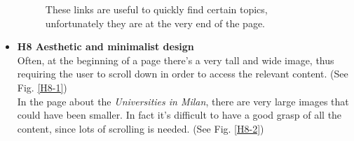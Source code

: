 \begin{itemize}
        \begin{figure}[!ht]
            \begin{minipage}{\linewidth}
                \centering
                \captionsetup{justification=centering}
                \caption{These links are useful to quickly find certain topics,\\unfortunately they are at the very end of the page.}
                \label{H7-1}
            \end{minipage}
        \end{figure}
    \item \textbf{H8 Aesthetic and minimalist design}\\
        Often, at the beginning of a page there's a very tall and wide image, thus requiring the user to scroll down in order to access the relevant content. (See Fig. \ref{H8-1})\\
        In the page about the \emph{Universities in Milan}, there are very large images that could have been smaller. In fact it's difficult to have a good grasp of all the content, since lots of scrolling is needed. (See Fig. \ref{H8-2})
        

\end{itemize}
